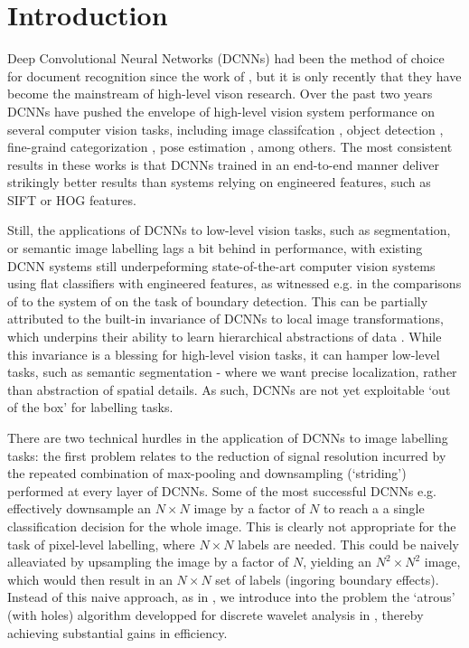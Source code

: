 \section{Introduction}
\label{sec:intro}
Deep Convolutional Neural Networks (DCNNs) had been the method of choice for document recognition since the work of \citet{LeCun1998}, but 
it is only recently that they have become the mainstream of high-level vison research.
Over the past two years  DCNNs have pushed the envelope of high-level vision system performance on several computer vision tasks, including image classifcation \citet{KrizhevskyNIPS2013, papandreou2014untangling, sermanet2013overfeat, simonyan2014very, szegedy2014going}, object detection \citet{girshick2014rcnn}, fine-graind categorization \citet{zhang2014part}, pose estimation \citet{chen2014articulated, tompson2014joint}, among others.
The most consistent results in these works is that DCNNs trained in an end-to-end manner  deliver  strikingly better results than systems relying on engineered features, such as SIFT or HOG features.

Still, the applications of DCNNs to low-level vision tasks, such as segmentation, or semantic image labelling  lags a bit behind in performance, with existing DCNN systems still underpeforming  state-of-the-art  computer vision systems using flat classifiers with engineered features, as witnessed e.g. in the comparisons of \cite{williams14} to the system of \cite{DollarZ13} on the task of boundary detection. 
 This can be partially attributed to the built-in  invariance of DCNNs to local image transformations, which underpins their ability to learn hierarchical abstractions of data \citep{zeiler2014visualizing}.
While this invariance is a blessing for high-level vision tasks, it can hamper low-level tasks, such as semantic segmentation - where we want precise localization, rather than abstraction of spatial details.  As such, DCNNs are not yet exploitable `out of the box' for labelling tasks. 

There are two technical hurdles in the application of DCNNs to image labelling tasks: the first problem relates to the reduction of signal resolution incurred by the repeated combination of max-pooling and downsampling (`striding') performed at every layer of DCNNs.  Some of the most successful  DCNNs e.g. 
\citep{KrizhevskyNIPS2013, simonyan2014very, szegedy2014going}
effectively downsample an $N\times N$ image by a factor of $N$ to reach a 
a single  classification decision for the whole image. This is clearly not appropriate for the task of pixel-level labelling, where $N \times N$ labels are needed. This could  be naively alleaviated by upsampling the image by a factor of $N$, yielding an $N^2\times N^2$ image, which would then result in an $N\times N$ set of labels (ingoring boundary effects). Instead of this naive approach, as in  \cite{papandreou2014untangling}, we introduce into the problem the `atrous' (with holes) algorithm developped for  discrete wavelet analysis in  \cite{Mall99}, thereby achieving substantial gains in efficiency. 

